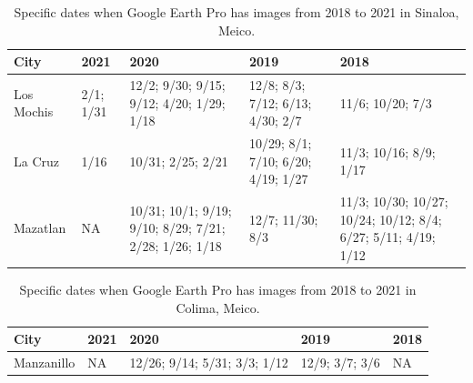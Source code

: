 \begin{table}[h!]
\centering
\begin{tabular}{ l | p{2.5cm} | p{2.5cm} | p{2.5cm} | p{2.5cm} }
\toprule
City & 2021 & 2020 & 2019 & 2018 \\
\midrule
Los Mochis & 2/1; 1/31 & 12/2; 9/30; 9/15; 9/12; 4/20; 1/29; 1/18 & 12/8; 8/3; 7/12; 6/13; 4/30; 2/7 & 11/6; 10/20; 7/3\\
\midrule
La Cruz & 1/16 & 10/31; 2/25; 2/21 & 10/29; 8/1; 7/10; 6/20; 4/19; 1/27 & 11/3; 10/16; 8/9; 1/17\\
\midrule
Mazatlan & NA & 10/31; 10/1; 9/19; 9/10; 8/29; 7/21; 2/28; 1/26; 1/18 & 12/7; 11/30; 8/3 & 11/3; 10/30; 10/27; 10/24; 10/12; 8/4; 6/27; 5/11; 4/19; 1/12\\
\bottomrule
\end{tabular}
\caption{Specific dates when Google Earth Pro has images from 2018 to 2021 in Sinaloa, Meico.}
\label{table:Sinaloa_dates}
\end{table}

\begin{table}[h!]
\centering
\begin{tabular}{ l | p{2.5cm} | p{2.5cm} | p{2.5cm} | p{2.5cm} }
\toprule
City & 2021 & 2020 & 2019 & 2018 \\
\midrule
Manzanillo & NA & 12/26; 9/14; 5/31; 3/3; 1/12 & 12/9; 3/7; 3/6 & NA\\
\bottomrule
\end{tabular}
\caption{Specific dates when Google Earth Pro has images from 2018 to 2021 in Colima, Meico.}
\label{table:Colima_dates}
\end{table}


